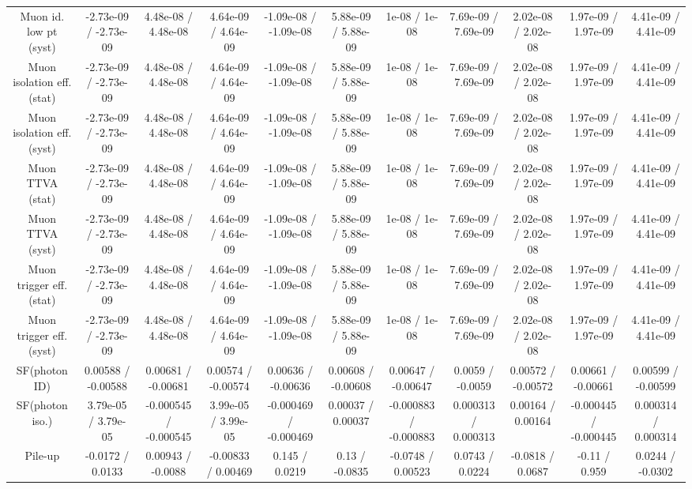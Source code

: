 \begin{table}[htbp]
\begin{center}
\begin{tabular}{|c|c|c|c|c|c|c|c|c|c|c|}
  Muon id. low pt (syst) & -2.73e-09 / -2.73e-09 & 4.48e-08 / 4.48e-08 & 4.64e-09 / 4.64e-09 & -1.09e-08 / -1.09e-08 & 5.88e-09 / 5.88e-09 & 1e-08 / 1e-08 & 7.69e-09 / 7.69e-09 & 2.02e-08 / 2.02e-08 & 1.97e-09 / 1.97e-09 & 4.41e-09 / 4.41e-09 \\ 
  Muon isolation eff. (stat) & -2.73e-09 / -2.73e-09 & 4.48e-08 / 4.48e-08 & 4.64e-09 / 4.64e-09 & -1.09e-08 / -1.09e-08 & 5.88e-09 / 5.88e-09 & 1e-08 / 1e-08 & 7.69e-09 / 7.69e-09 & 2.02e-08 / 2.02e-08 & 1.97e-09 / 1.97e-09 & 4.41e-09 / 4.41e-09 \\ 
  Muon isolation eff. (syst) & -2.73e-09 / -2.73e-09 & 4.48e-08 / 4.48e-08 & 4.64e-09 / 4.64e-09 & -1.09e-08 / -1.09e-08 & 5.88e-09 / 5.88e-09 & 1e-08 / 1e-08 & 7.69e-09 / 7.69e-09 & 2.02e-08 / 2.02e-08 & 1.97e-09 / 1.97e-09 & 4.41e-09 / 4.41e-09 \\ 
  Muon TTVA (stat) & -2.73e-09 / -2.73e-09 & 4.48e-08 / 4.48e-08 & 4.64e-09 / 4.64e-09 & -1.09e-08 / -1.09e-08 & 5.88e-09 / 5.88e-09 & 1e-08 / 1e-08 & 7.69e-09 / 7.69e-09 & 2.02e-08 / 2.02e-08 & 1.97e-09 / 1.97e-09 & 4.41e-09 / 4.41e-09 \\ 
  Muon TTVA (syst) & -2.73e-09 / -2.73e-09 & 4.48e-08 / 4.48e-08 & 4.64e-09 / 4.64e-09 & -1.09e-08 / -1.09e-08 & 5.88e-09 / 5.88e-09 & 1e-08 / 1e-08 & 7.69e-09 / 7.69e-09 & 2.02e-08 / 2.02e-08 & 1.97e-09 / 1.97e-09 & 4.41e-09 / 4.41e-09 \\ 
  Muon trigger eff. (stat) & -2.73e-09 / -2.73e-09 & 4.48e-08 / 4.48e-08 & 4.64e-09 / 4.64e-09 & -1.09e-08 / -1.09e-08 & 5.88e-09 / 5.88e-09 & 1e-08 / 1e-08 & 7.69e-09 / 7.69e-09 & 2.02e-08 / 2.02e-08 & 1.97e-09 / 1.97e-09 & 4.41e-09 / 4.41e-09 \\ 
  Muon trigger eff. (syst) & -2.73e-09 / -2.73e-09 & 4.48e-08 / 4.48e-08 & 4.64e-09 / 4.64e-09 & -1.09e-08 / -1.09e-08 & 5.88e-09 / 5.88e-09 & 1e-08 / 1e-08 & 7.69e-09 / 7.69e-09 & 2.02e-08 / 2.02e-08 & 1.97e-09 / 1.97e-09 & 4.41e-09 / 4.41e-09 \\ 
  SF(photon ID) & 0.00588 / -0.00588 & 0.00681 / -0.00681 & 0.00574 / -0.00574 & 0.00636 / -0.00636 & 0.00608 / -0.00608 & 0.00647 / -0.00647 & 0.0059 / -0.0059 & 0.00572 / -0.00572 & 0.00661 / -0.00661 & 0.00599 / -0.00599 \\ 
  SF(photon iso.) & 3.79e-05 / 3.79e-05 & -0.000545 / -0.000545 & 3.99e-05 / 3.99e-05 & -0.000469 / -0.000469 & 0.00037 / 0.00037 & -0.000883 / -0.000883 & 0.000313 / 0.000313 & 0.00164 / 0.00164 & -0.000445 / -0.000445 & 0.000314 / 0.000314 \\ 
  Pile-up & -0.0172 / 0.0133 & 0.00943 / -0.0088 & -0.00833 / 0.00469 & 0.145 / 0.0219 & 0.13 / -0.0835 & -0.0748 / 0.00523 & 0.0743 / 0.0224 & -0.0818 / 0.0687 & -0.11 / 0.959 & 0.0244 / -0.0302 \\ 

\end{tabular}
\end{center}
\end{table}
